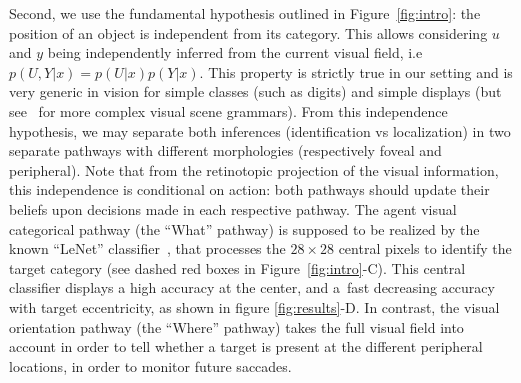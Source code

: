 Second, we %
use the fundamental hypothesis outlined in Figure~\ref{fig:intro}: the position of an object is independent from its category.  This allows considering $u$ and $y$ being independently inferred from the current visual field, i.e $p(U,Y|x) = p(U|x) p(Y|x)$. This property is strictly true in our setting and is very generic in vision for simple classes (such as digits) and simple displays (but see~\citep{Vo12} for more complex visual scene grammars). 
From this independence hypothesis, we may separate both inferences (identification vs localization) in two separate pathways with different morphologies (respectively foveal and peripheral). Note that from the retinotopic projection of the visual information, this independence is conditional on action: both pathways should update their beliefs upon decisions made in each respective pathway.
The agent visual categorical pathway (the ``What'' pathway) is supposed to be realized by the known ``LeNet'' classifier~\citep{Lecun1998}, that processes the $28 \times 28$ central pixels to identify the target category (see dashed red boxes in  Figure~\ref{fig:intro}-C). This central classifier displays a high accuracy at the center, and a fast decreasing accuracy with target eccentricity, as shown in figure \ref{fig:results}-D. In contrast, the visual orientation pathway (the ``Where'' pathway) takes the full visual field into account in order to tell whether a target is present at the different peripheral locations, in order to monitor future saccades.

